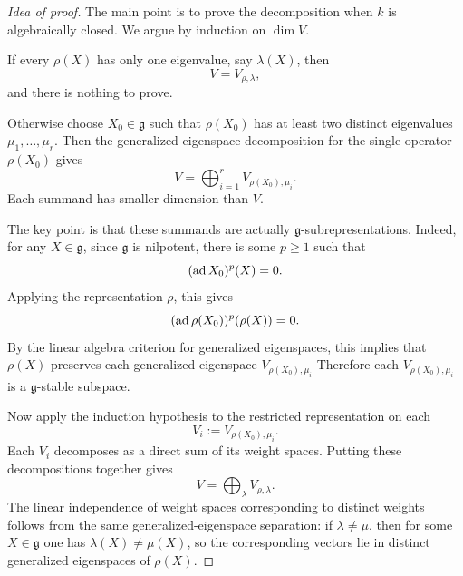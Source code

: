 \documentclass[12pt]{article}
\begin{document}
\begin{proof}[Idea of proof]
    The main point is to prove the decomposition when $k$ is algebraically closed.
    We argue by induction on $\dim V$.

    If every $\rho(X)$ has only one eigenvalue, say $\lambda(X)$, then
    \[
        V=V_{\rho,\lambda},
    \]
    and there is nothing to prove.

    Otherwise choose $X_0\in \mathfrak g$ such that $\rho(X_0)$ has at least two
    distinct eigenvalues $\mu_1,\dots,\mu_r$. Then the generalized eigenspace
    decomposition for the single operator $\rho(X_0)$ gives
    \[
        V=\bigoplus_{i=1}^r V_{\rho(X_0),\mu_i}.
    \]
    Each summand has smaller dimension than $V$.

    The key point is that these summands are actually $\mathfrak g$-subrepresentations.
    Indeed, for any $X\in \mathfrak g$, since $\mathfrak g$ is nilpotent, there is
    some $p\geq 1$ such that
    \[
        (\operatorname{ad} X_0)^p(X)=0.
    \]
    Applying the representation $\rho$, this gives
    \[
        (\operatorname{ad} \rho(X_0))^p(\rho(X))=0.
    \]
    By the linear algebra criterion for generalized eigenspaces, this implies that
    $\rho(X)$ preserves each generalized eigenspace $V_{\rho(X_0),\mu_i}$
    Therefore each $V_{\rho(X_0),\mu_i}$ is a $\mathfrak g$-stable subspace.

    Now apply the induction hypothesis to the restricted representation on each
    \[
        V_i:=V_{\rho(X_0),\mu_i}.
    \]
    Each $V_i$ decomposes as a direct sum of its weight spaces. Putting these
    decompositions together gives
    \[
        V=\bigoplus_{\lambda} V_{\rho,\lambda}.
    \]
    The linear independence of weight spaces corresponding to distinct weights
    follows from the same generalized-eigenspace separation: if
    \(\lambda\neq \mu\), then for some \(X\in \mathfrak g\) one has
    \(\lambda(X)\neq \mu(X)\), so the corresponding vectors lie in distinct
    generalized eigenspaces of \(\rho(X)\).
\end{proof}
\end{document}
